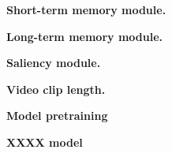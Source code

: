 
\noindent\textbf{Short-term memory module.}

\noindent\textbf{Long-term memory module.}

\noindent\textbf{Saliency module.}

\noindent\textbf{Video clip length.}

\noindent\textbf{Model pretraining}

\noindent\textbf{XXXX model}

